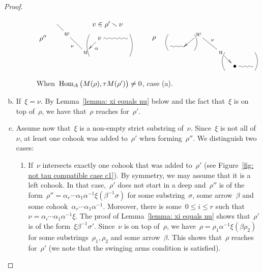 \documentclass{amsart}
\theoremstyle{definition}
\newcommand{\ssm}{\smallsetminus} %
\newcommand{\Hom}[1]{\operatorname{{\rm Hom}}_{#1}}
\begin{document}
\begin{proof}
\begin{enumerate}[(a)]
\begin{figure}[h]
 	\capstart
\[
\xy
%
(0,0)*+{\rho''};
(7,7)="1";
(11.8,2.2)*+{w}="2";
(21,-7)*+{u}="3";
(28,0)*+{v}="4";
(42,0)="6";
%
{\ar@{-} "1";"2"};
{\ar@{-}_{\nu} "2";"3"};
{\ar^{\alpha} "4";"3"};
{\ar@{~} "4";"6"};
%
{\ar@/^.3pc/@{-} (23,-9);(23,2)};
{\ar@/_.3pc/@{-} (43,-9);(43,2)};
%
(32,7)*+{v\in \rho'\ssm\nu};
%
%
%
(55,0)*+{\rho};
(63,-4)="11";
(70,-4)="12";
(77,2)*+{w}="13";
(88,-7)*+{u}="14";
(95,-14)*+{\bullet}="15";
(104,-14)="16";
%
{\ar@{~} "11";"12"};
{\ar "13";"12"};
{\ar@{-}^{\nu} "13";"14"};
{\ar "14";"15"};
{\ar@{~} "15";"16"};
%
{\ar@/^.3pc/@{-} (62,-6);(62,2)};
{\ar@/_.3pc/@{-} (75,-6);(75,2)};
%
{\ar@/_.3pc/@{-} (90,-7);(90,-16)};
{\ar@/^.3pc/@{-} (105,-7);(105,-16)};
%
\endxy
\]
    \caption{When~$\Hom{A} \big( M(\rho), \tau M(\rho') \big) \ne 0$, case (a).}
    \label{fig:not tau compatible case a}
\end{figure}

\item If~$\xi=\nu$. By Lemma~\ref{lemma: xi equals nu} below and the fact that~$\xi$ is on top of~$\rho$, we have that~$\rho$ reaches for~$\rho'$. 

\item Assume now that~$\xi$ is a non-empty strict substring of~$\nu$. Since~$\xi$ is not all of~$\nu$, at least one cohook was added to~$\rho'$ when forming~$\rho''$. We distinguish two cases:

\begin{enumerate}[(c1)]
\item If~$\nu$ intersects exactly one cohook that was added to~$\rho'$ (see Figure~\ref{fig: not tau compatible case c1}).
By symmetry, we may assume that it is a left cohook.
In that case,~$\rho'$ does not start in a deep and~$\rho''$ is of the form~$\rho''=\alpha_r\cdots\alpha_1\alpha^{-1}\xi(\beta^{-1}\sigma)$ for some substring~$\sigma$, some arrow~$\beta$ and some cohook~$\alpha_r\cdots\alpha_1\alpha^{-1}$.
Moreover, there is some~$0\leq i\leq r$ such that~$\nu=\alpha_i\cdots\alpha_1\alpha^{-1}\xi$.
The proof of Lemma~\ref{lemma: xi equals nu} shows that~$\rho'$ is of the form~$\xi\beta^{-1}\sigma'$.
Since~$\nu$ is on top of~$\rho$, we have~$\rho=\rho_1\alpha^{-1}\xi(\beta\rho_2)$ for some substrings~$\rho_1,\rho_2$ and some arrow~$\beta$.
This shows that~$\rho$ reaches for~$\rho'$ (we note that the swinging arms condition is satisfied).


\end{enumerate}
\end{enumerate}
\end{proof}
\end{document}
